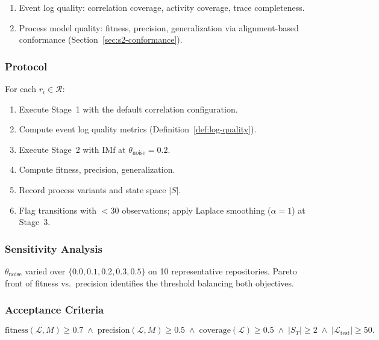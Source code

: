 \begin{enumerate}
    \item Event log quality: correlation coverage, activity coverage,
    trace completeness.
    \item Process model quality: fitness, precision, generalization via
    alignment-based conformance (Section~\ref{sec:s2-conformance}).
\end{enumerate}

\subsubsection{Protocol}

For each $r_i \in \mathcal{R}$:
\begin{enumerate}
    \item Execute Stage~1 with the default correlation configuration.
    \item Compute event log quality metrics
    (Definition~\ref{def:log-quality}).
    \item Execute Stage~2 with IMf at $\theta_{\text{noise}} = 0.2$.
    \item Compute fitness, precision, generalization.
    \item Record process variants and state space $|S|$.
    \item Flag transitions with $< 30$ observations; apply Laplace
    smoothing ($\alpha = 1$) at Stage~3.
\end{enumerate}

\subsubsection{Sensitivity Analysis}

$\theta_{\text{noise}}$ varied over $\{0.0, 0.1, 0.2, 0.3, 0.5\}$ on 10
representative repositories. Pareto front of fitness vs.\ precision
identifies the threshold balancing both objectives.

\subsubsection{Acceptance Criteria}

\begin{equation}
\label{eq:acceptance}
\text{fitness}(\mathcal{L}, M) \geq 0.7 \;\wedge\;
\text{precision}(\mathcal{L}, M) \geq 0.5 \;\wedge\;
\text{coverage}(\mathcal{L}) \geq 0.5 \;\wedge\;
|S_T| \geq 2 \;\wedge\;
|\mathcal{L}_{\text{test}}| \geq 50.
\end{equation}

